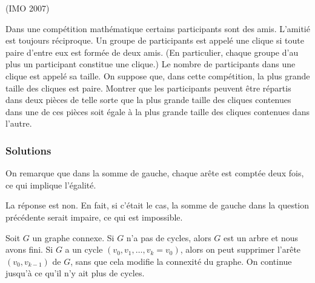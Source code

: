 \begin{exo}

(IMO 2007)

Dans une compétition mathématique certains participants sont des amis. L’amitié est toujours réciproque. Un groupe de participants est appelé une clique si toute paire d’entre eux est formée de deux amis. (En particulier, chaque groupe d’au plus un participant constitue une clique.) Le nombre de participants dans une clique est appelé sa taille. On suppose que, dans cette compétition, la plus grande taille des cliques est paire. Montrer que les participants peuvent être répartis dans deux pièces de telle sorte que la plus grande taille des cliques contenues dans une de ces pièces soit égale à la plus grande taille des cliques contenues dans l’autre.

\end{exo}




\subsubsection{Solutions}



\begin{sol}

On remarque que dans la somme de gauche, chaque arête est comptée deux fois, ce qui implique l’égalité.\\

\end{sol}

\begin{sol}

La réponse est non. En fait, si c’était le cas, la somme de gauche dans la question précédente serait impaire, ce qui est impossible.\\

\end{sol}





\begin{sol}

Soit $G$ un graphe connexe. Si $G$ n'a pas de cycles, alors $G$ est un arbre et nous avons fini. Si $G$ a un cycle $(v_0, v_1,\ldots ,v_k = v_0)$, alors on peut supprimer l'arête $(v_0, v_{k-1})$ de $G$, sans que cela modifie la connexité du graphe. On continue jusqu’à ce qu’il n’y ait plus de cycles.\\

\end{sol}


